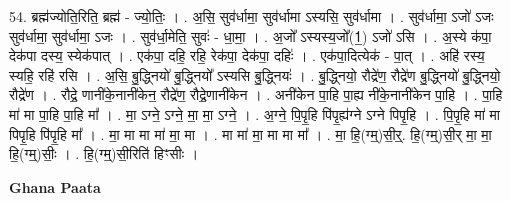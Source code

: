 \documentclass[17pt]{extarticle}
\begin{document}
54. ब्रह्म॑ज्योति॒रिति॒ ब्रह्म॑ - ज्यो॒तिः॒ । . अ॒सि॒ सुव॑र्धामा॒ सुव॑र्धामा ऽस्यसि॒ सुव॑र्धामा । . सुव॑र्धामा॒ ऽजो॑ ऽजः सुव॑र्धामा॒ सुव॑र्धामा॒ ऽजः । . सुव॑र्धा॒मेति॒ सुवः॑ - धा॒मा॒ । . अ॒जो᳚ ऽस्यस्य॒जो᳚(1॒) ऽजो॑ ऽसि । . अ॒स्ये क॑पा॒ देक॑पा दस्य॒ स्येक॑पात् । . एक॑पा॒ दहि॒ रहि॒ रेक॑पा॒ देक॑पा॒ दहिः॑ । . एक॑पा॒दित्येक॑ - पा॒त् । . अहि॑ रस्य॒ स्यहि॒ रहि॑ रसि । . अ॒सि॒ बु॒द्ध्नियो॑ बु॒द्ध्नियो᳚ ऽस्यसि बु॒द्ध्नियः॑ । . बु॒द्ध्नियो॒ रौद्रे॑ण॒ रौद्रे॑ण बु॒द्ध्नियो॑ बु॒द्ध्नियो॒ रौद्रे॑ण । . रौद्रे॒ णानी॑के॒नानी॑केन॒ रौद्रे॑ण॒ रौद्रे॒णानी॑केन । . अनी॑केन पा॒हि पा॒ह्य नी॑के॒नानी॑केन पा॒हि । . पा॒हि मा॑ मा पा॒हि पा॒हि मा᳚ । . मा॒ ऽग्ने॒ ऽग्ने॒ मा॒ मा॒ ऽग्ने॒ । . अ॒ग्ने॒ पि॒पृ॒हि पि॑पृ॒ह्य॑ग्ने ऽग्ने पिपृ॒हि । . पि॒पृ॒हि मा॑ मा पिपृ॒हि पि॑पृ॒हि मा᳚ । . मा॒ मा मा मा॑ मा॒ मा । . मा मा॑ मा॒ मा मा मा᳚ । . मा॒ हि॒(ग्म्॒)सी॒र्॒. हि॒(ग्म्॒)सी॒र् मा॒ मा॒ हि॒(ग्म्॒)सीः॒ । . हि॒(ग्म्॒)सी॒रिति॑ हिꣳसीः । \newline

\textbf{Ghana Paata } \newline
\end{document}
